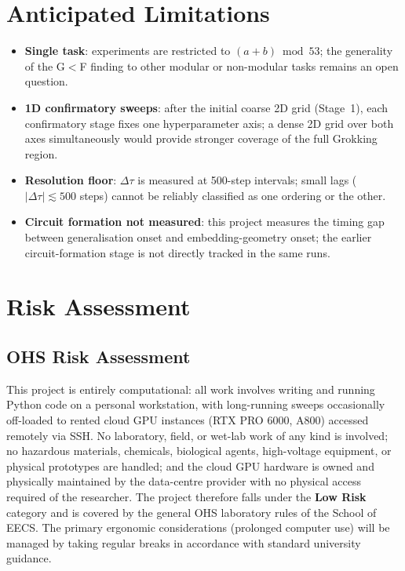 \documentclass[12pt,openany,oneside,a4paper]{book}
\newcommand{\Dtau}{\Delta\tau}
\begin{document}
\section{Anticipated Limitations}

\begin{itemize}
  \item \textbf{Single task}: experiments are restricted to
    $(a+b)\bmod 53$; the generality of the G$<$F finding to other
    modular or non-modular tasks remains an open question.
  \item \textbf{1D confirmatory sweeps}: after the initial coarse 2D
    grid (Stage~1), each confirmatory stage fixes one hyperparameter
    axis; a dense 2D grid over both axes simultaneously would provide
    stronger coverage of the full Grokking region.
  \item \textbf{Resolution floor}: $\Dtau$ is measured at 500-step
    intervals; small lags ($|\Dtau|\lesssim500$ steps) cannot be
    reliably classified as one ordering or the other.
  \item \textbf{Circuit formation not measured}: this project measures
    the timing gap between generalisation onset and embedding-geometry
    onset; the earlier circuit-formation stage is not directly tracked
    in the same runs.
\end{itemize}

\section{Risk Assessment}

\subsection{OHS Risk Assessment}

This project is entirely computational: all work involves writing
and running Python code on a personal workstation, with long-running
sweeps occasionally off-loaded to rented cloud GPU instances (RTX PRO
6000, A800) accessed remotely via SSH.
No laboratory, field, or wet-lab work of any kind is involved; no
hazardous materials, chemicals, biological agents, high-voltage
equipment, or physical prototypes are handled; and the cloud GPU
hardware is owned and physically maintained by the data-centre
provider with no physical access required of the researcher.
The project therefore falls under the \textbf{Low Risk} category and
is covered by the general OHS laboratory rules of the School of EECS.
The primary ergonomic considerations (prolonged computer use) will be
managed by taking regular breaks in accordance with standard university
guidance.
\end{document}
